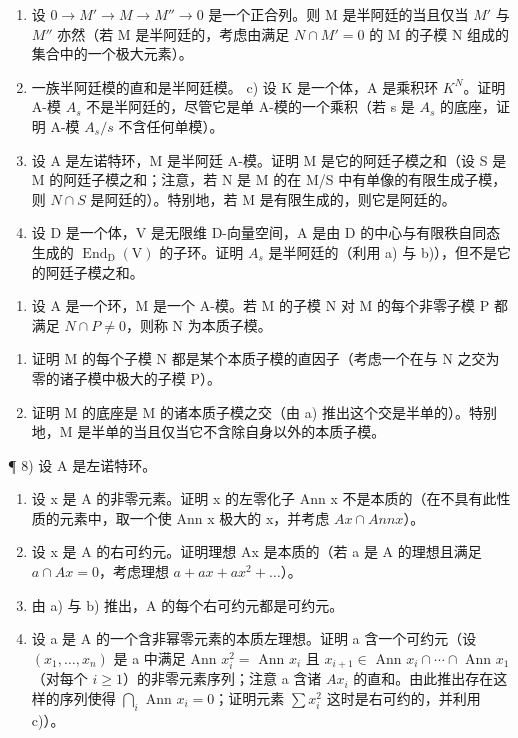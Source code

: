 \begin{enumerate}
\def\labelenumi{\alph{enumi})}
\item
  设 \(0 \rightarrow M' \rightarrow M \rightarrow M'' \rightarrow 0\) 是一个正合列。则 M 是半阿廷的当且仅当 \(M'\) 与 \(M''\) 亦然（若 M 是半阿廷的，考虑由满足 \(N \cap M' = 0\) 的 M 的子模 N 组成的集合中的一个极大元素）。
\item
  一族半阿廷模的直和是半阿廷模。 c) 设 K 是一个体，A 是乘积环 \(K^{N}\)。证明 A-模 \(A_{s}\) 不是半阿廷的，尽管它是单 A-模的一个乘积（若 s 是 \(A_{s}\) 的底座，证明 A-模 \(A_{s}/s\) 不含任何单模）。
\item
  设 A 是左诺特环，M 是半阿廷 A-模。证明 M 是它的阿廷子模之和（设 S 是 M 的阿廷子模之和；注意，若 N 是 M 的在 M/S 中有单像的有限生成子模，则 \(N \cap S\) 是阿廷的）。特别地，若 M 是有限生成的，则它是阿廷的。
\item
  设 D 是一个体，V 是无限维 D-向量空间，A 是由 D 的中心与有限秩自同态生成的 \(\operatorname{End}_{\mathrm{D}}(\mathrm{V})\) 的子环。证明 \(A_{s}\) 是半阿廷的（利用 a) 与 b)），但不是它的阿廷子模之和。
\end{enumerate}

\begin{enumerate}
\def\labelenumi{\arabic{enumi})}
\setcounter{enumi}{6}
\tightlist
\item
  设 A 是一个环，M 是一个 A-模。若 M 的子模 N 对 M 的每个非零子模 P 都满足 \(N \cap P \neq 0\)，则称 N 为本质子模。
\end{enumerate}

\begin{enumerate}
\def\labelenumi{\alph{enumi})}
\item
  证明 M 的每个子模 N 都是某个本质子模的直因子（考虑一个在与 N 之交为零的诸子模中极大的子模 P）。
\item
  证明 M 的底座是 M 的诸本质子模之交（由 a) 推出这个交是半单的）。特别地，M 是半单的当且仅当它不含除自身以外的本质子模。
\end{enumerate}

¶ 8) 设 A 是左诺特环。

\begin{enumerate}
\def\labelenumi{\alph{enumi})}
\item
  设 x 是 A 的非零元素。证明 x 的左零化子 Ann x 不是本质的（在不具有此性质的元素中，取一个使 Ann x 极大的 x，并考虑 \(Ax \cap Ann x\)）。
\item
  设 x 是 A 的右可约元。证明理想 Ax 是本质的（若 a 是 A 的理想且满足 \(a \cap Ax = 0\)，考虑理想 \(a + ax + ax^{2} + \ldots\)）。
\item
  由 a) 与 b) 推出，A 的每个右可约元都是可约元。
\item
  设 a 是 A 的一个含非幂零元素的本质左理想。证明 a 含一个可约元（设 \((x_{1},\ldots,x_{n})\) 是 a 中满足 Ann \(x_{i}^{2}=\) Ann \(x_{i}\) 且 \(x_{i+1}\in\) Ann \(x_{i}\cap\cdots\cap\) Ann \(x_{1}\)（对每个 \(i\geqslant1\)）的非零元素序列；注意 a 含诸 \(Ax_{i}\) 的直和。由此推出存在这样的序列使得 \(\bigcap_{i}\) Ann \(x_{i}=0\)；证明元素 \(\sum x_{i}^{2}\) 这时是右可约的，并利用 c)）。
\end{enumerate}

